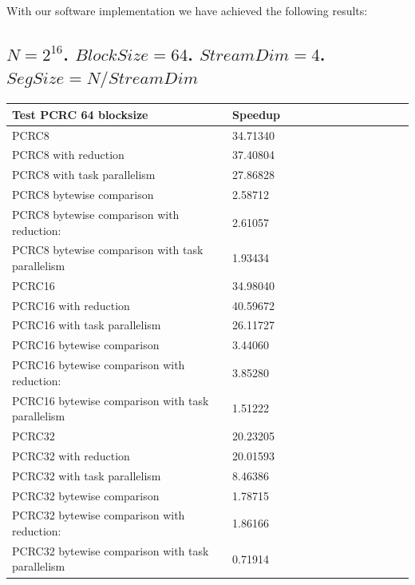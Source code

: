\documentclass[fleqn]{IEEEtran}
\begin{document}
With our software implementation we have achieved the following results:

\subsection{$N=2^{16}$. $BlockSize=64$. $StreamDim=4$. $SegSize=N/StreamDim$}
\begin{footnotesize}
\begin{tabular}{l|l|l|l|l|r|r|r|r|r|r||c|c|}
\toprule
\textbf{Test PCRC 64 blocksize} & \textbf{Speedup} \\
\midrule
PCRC8                                           &	34.71340 \\
PCRC8 with reduction                            &	37.40804 \\
PCRC8 with task parallelism                     &	27.86828 \\
PCRC8 bytewise comparison                       &	2.58712  \\
PCRC8 bytewise comparison with reduction:       &	2.61057  \\
PCRC8 bytewise comparison with task parallelism &	1.93434  \\
PCRC16                                           &	34.98040 \\
PCRC16 with reduction                            &	40.59672 \\
PCRC16 with task parallelism                     &	26.11727 \\
PCRC16 bytewise comparison                       &	3.44060  \\
PCRC16 bytewise comparison with reduction:       &	3.85280  \\
PCRC16 bytewise comparison with task parallelism &	1.51222  \\
PCRC32                                           &	20.23205 \\
PCRC32 with reduction                            &	20.01593 \\
PCRC32 with task parallelism                     &	8.46386  \\
PCRC32 bytewise comparison                       &	1.78715  \\
PCRC32 bytewise comparison with reduction:       &	1.86166  \\
PCRC32 bytewise comparison with task parallelism &	0.71914  \\
\bottomrule
\end{tabular}
\end{footnotesize}
\end{document}
